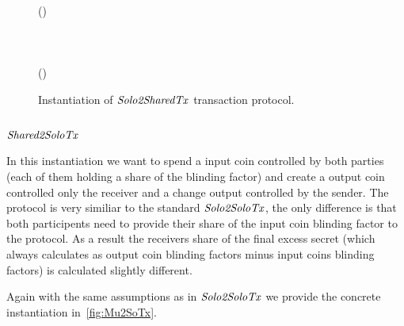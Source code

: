 \begin{figure}
\begin{center}
{\begin{varwidth}{\textwidth}
{            \< \scriptstyle (\varSigAlice \opSeperate \varSigBob) \opFunResult {} \< \\
              \< \< \\
            \varSigFin \opFunResult \procFinSig{\varSigAlice}{\varSigBob} \< \< \\
            \varExcess \opAssign {} \opAddPoint {} \< \< \\
            \scriptstyle \pcreturn \varTx \opAssign \varTx \opUnion (\varExcess \opSeperate \varSigFin \opSeperate \varProof)
            }
        \end{varwidth}
        }
    \end{center}
    \caption{Instantiation of $\mathit{Solo2SharedTx}$ transaction protocol. \label{fig:So2MuTx}}
\end{figure}

\subsection{$\mathit{Shared2SoloTx}$}

In this instantiation we want to spend a input coin controlled by both parties (each of them holding a share of the blinding factor) and create a output coin controlled only the receiver and a change output controlled by
the sender. The protocol is very similiar to the standard $\mathit{Solo2SoloTx}$, the only difference is that both participents need to provide their share of the input coin blinding factor to the protocol. As a result the receivers
share of the final excess secret (which always calculates as output coin blinding factors minus input coins blinding factors) is calculated slightly different.

Again with the same assumptions as in $\mathit{Solo2SoloTx}$ we provide the concrete instantiation in~\ref{fig:Mu2SoTx}.

